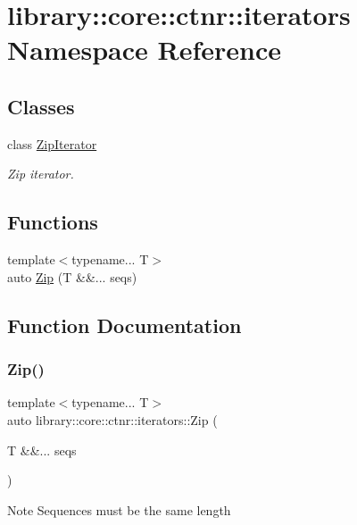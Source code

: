 \hypertarget{namespacelibrary_1_1core_1_1ctnr_1_1iterators}{}\section{library\+:\+:core\+:\+:ctnr\+:\+:iterators Namespace Reference}
\label{namespacelibrary_1_1core_1_1ctnr_1_1iterators}
\subsection*{Classes}
\begin{DoxyCompactItemize}
\item 
class \hyperlink{classlibrary_1_1core_1_1ctnr_1_1iterators_1_1_zip_iterator}{Zip\+Iterator}
\begin{DoxyCompactList}\small\item\em Zip iterator. \end{DoxyCompactList}\end{DoxyCompactItemize}
\subsection*{Functions}
\begin{DoxyCompactItemize}
\item 
{\footnotesize template$<$typename... T$>$ }\\auto \hyperlink{namespacelibrary_1_1core_1_1ctnr_1_1iterators_a42406e4b2d99c4ff14d1412f15674788}{Zip} (T \&\&... seqs)
\end{DoxyCompactItemize}


\subsection{Function Documentation}
\mbox{\label{namespacelibrary_1_1core_1_1ctnr_1_1iterators_a42406e4b2d99c4ff14d1412f15674788}} 
\subsubsection{\texorpdfstring{Zip()}{Zip()}}
{\footnotesize\ttfamily template$<$typename... T$>$ \\
auto library\+::core\+::ctnr\+::iterators\+::\+Zip (\begin{DoxyParamCaption}\item[{T \&\&...}]{seqs }\end{DoxyParamCaption})}

\begin{DoxyNote}{Note}
Sequences must be the same length 
\end{DoxyNote}
